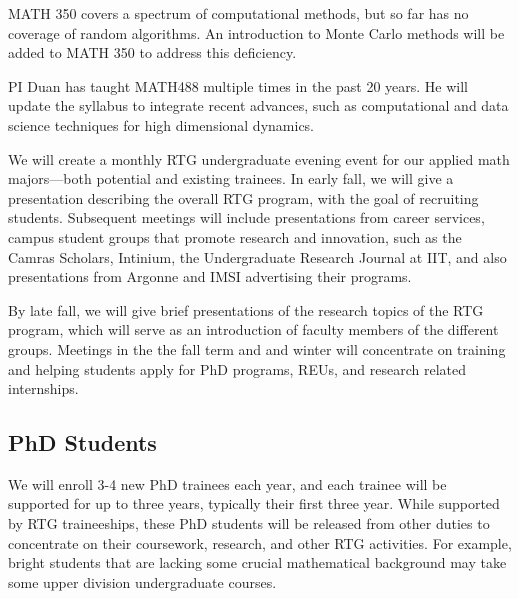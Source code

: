 \documentclass[11pt]{NSFamsart}
\begin{document}
MATH 350 covers a spectrum of computational methods, but so far has no coverage of random algorithms. An introduction to Monte Carlo methods will be added to MATH 350 to address this deficiency.

PI Duan has taught MATH488 multiple  times in the past 20 years.  He will update the syllabus to integrate recent advances, such as computational and data science techniques for high dimensional dynamics. 

We will create a monthly RTG undergraduate evening event for our applied math majors---both potential and existing trainees.  In early fall, we will give a presentation describing the overall RTG program, with the goal of recruiting students. Subsequent meetings will include presentations from   career services, campus student groups that promote research and innovation, such as the Camras Scholars, Intinium, the Undergraduate Research Journal at IIT, and also presentations from Argonne and IMSI advertising their programs. 

By late fall, we will give brief presentations of the research topics of the RTG program, which will serve as an introduction of faculty members of the different
groups. Meetings in the the fall term and and winter will concentrate on training and helping students apply for PhD programs, REUs, and research related internships. 



\subsection*{PhD Students}


We will enroll 3-4 new PhD trainees each year, and each trainee will be supported for up to three years, typically their first three year.  While supported by RTG traineeships, these PhD students will be released from other duties to concentrate on their coursework, research, and other RTG activities.  For example, bright students that are lacking some crucial mathematical background may take some upper division undergraduate courses.  
\end{document}
